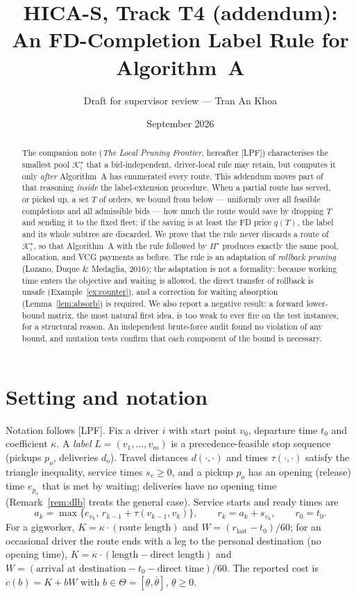 \documentclass[11pt]{article}
\title{HICA-S, Track T4 (addendum):\\ An FD-Completion Label Rule for Algorithm~A}
\author{Draft for supervisor review --- Tran An Khoa}
\date{September 2026}
\theoremstyle{definition}
\theoremstyle{remark}
\newcommand{\Ks}{\mathcal{K}^{\star}}
\newcommand{\thl}{\underline{\theta}}
\newcommand{\thu}{\overline{\theta}}
\newcommand{\0}{\mathbf{0}}
\begin{document}
\maketitle

\begin{abstract}
The companion note (\emph{The Local Pruning Frontier}, hereafter [LPF]) characterises the
smallest pool $\Ks_i$ that a bid-independent, driver-local rule may retain, but computes
it only \emph{after} Algorithm~A has enumerated every route. This addendum moves part of that
reasoning \emph{inside} the label-extension procedure. When a partial route has served, or
picked up, a set $T$ of orders, we bound from below --- uniformly over all feasible
completions and all admissible bids --- how much the route would save by dropping $T$ and
sending it to the fixed fleet; if the saving is at least the FD price $q(T)$, the label and its
whole subtree are discarded. We prove that the rule never discards a route of $\Ks_i$, so that
Algorithm~A with the rule followed by $\Pi^\star$ produces exactly the same pool, allocation,
and VCG payments as before. The rule is an adaptation of \emph{rollback pruning}
(Lozano, Duque \& Medaglia, 2016); the adaptation is not a formality: because working time
enters the objective and waiting is allowed, the direct transfer of rollback is unsafe
(Example~\ref{ex:counter}), and a correction for waiting absorption
(Lemma~\ref{lem:absorb}) is required. We also report a negative result: a forward
lower-bound matrix, the most natural first idea, is too weak to ever fire on the test
instances, for a structural reason. An independent brute-force audit found no violation of any
bound, and mutation tests confirm that each component of the bound is necessary.
\end{abstract}

\section{Setting and notation}

Notation follows [LPF]. Fix a driver $i$ with start point $v_0$, departure time $t_0$ and
coefficient $\kappa$. A \emph{label} $L=(v_1,\dots,v_m)$ is a precedence-feasible stop
sequence (pickups $p_o$, deliveries $d_o$). Travel distances $d(\cdot,\cdot)$ and times
$\tau(\cdot,\cdot)$ satisfy the triangle inequality, service times $s_v\ge 0$, and a pickup
$p_o$ has an opening (release) time $e_{p_o}$ that is met by waiting; deliveries have no
opening time (Remark~\ref{rem:dlb} treats the general case). Service starts and ready times
are
\[
a_k=\max\{e_{v_k},\,r_{k-1}+\tau(v_{k-1},v_k)\},\qquad r_k=a_k+s_{v_k},\qquad r_0=t_0 .
\]
For a gigworker, $K=\kappa\cdot(\text{route length})$ and $W=(r_{\text{last}}-t_0)/60$; for an
occasional driver the route ends with a leg to the personal destination (no opening time),
$K=\kappa\cdot(\text{length}-\text{direct length})$ and
$W=(\text{arrival at destination}-t_0-\text{direct time})/60$. The reported cost is
$c(b)=K+bW$ with $b\in\Theta=[\thl,\thu]$, $\thl\ge 0$.
\end{document}
